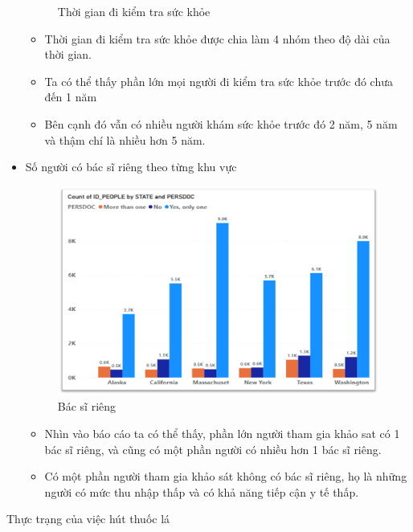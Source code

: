 \begin{itemize}[label=$-$]
\begin{center}
\begin{figure}[!h]
              \caption{Thời gian đi kiểm tra sức khỏe }
            \end{figure}
\end{center}
\begin{itemize}[label=$+$]
\item Thời gian đi kiểm tra sức khỏe được chia làm 4 nhóm theo độ dài của thời gian.
\item Ta có thể thấy phần lớn mọi người đi kiểm tra sức khỏe trước đó chưa đến 1 năm 
\item Bên cạnh đó vẫn có nhiều người khám sức khỏe trước đó 2 năm, 5 năm và thậm chí là nhiều hơn 5 năm.
\end{itemize}
\item Số người có bác sĩ riêng theo từng khu vực
\begin{center}
            \begin{figure}[!h]
                \centering
                \includegraphics[scale = 0.6]{figures/Hoa/DE2.3.png} 
              \caption{Bác sĩ riêng }
            \end{figure}
\end{center}
\begin{itemize}[label=$+$]
\item Nhìn vào báo cáo ta có thể thấy, phần lớn người tham gia khảo sat có 1 bác sĩ riêng, và cũng có một phần người có nhiều hơn 1 bác sĩ riêng.
\item Có một phần người tham gia khảo sát không có bác sĩ riêng, họ là những người có mức thu nhập thấp và có khả năng tiếp cận y tế thấp.
\end{itemize}
\end{itemize}
Thực trạng của việc hút thuốc lá

